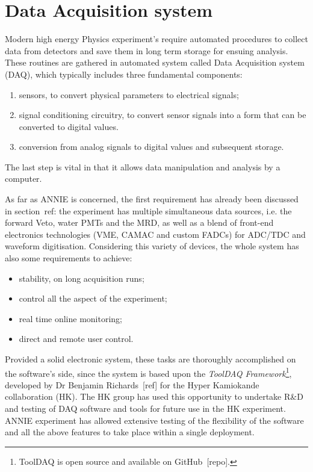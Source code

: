 
\chapter[Data Acquisition]{Data Acquisition system}
\label{cha:3}

Modern high energy Physics experiment's require automated procedures to collect data from detectors %
and save them in long term storage for ensuing analysis.
These routines are gathered in automated system called Data Acquisition system (DAQ), %
which typically includes three fundamental components:
\begin{enumerate}
  \item sensors, to convert physical parameters to electrical signals;
  \item signal conditioning circuitry, to convert sensor signals into a form that %
    can be converted to digital values.
  \item conversion from analog signals to digital values and subsequent storage.
\end{enumerate}
The last step is vital in that it allows data manipulation and analysis by a computer.

As far as ANNIE is concerned, the first requirement has already been discussed in section~ref: %
the experiment has multiple simultaneous data sources, i.e. %
the forward Veto, water PMTs and the MRD, as well as a blend of front-end %
electronics technologies (VME, CAMAC and custom FADCs) for ADC/TDC and waveform digitisation.
Considering this variety of devices, the whole system has also some requirements to achieve:
\begin{itemize}
  \item stability, on long acquisition runs;
  \item control all the aspect of the experiment;
  \item real time online monitoring;
  \item direct and remote user control.
\end{itemize}

Provided a solid electronic system, these tasks are thoroughly accomplished on the %
software's side, since the system is based upon the %
\emph{ToolDAQ Framework}\footnote{ToolDAQ %
  is open source and available on GitHub~[repo].}, developed %
by Dr Benjamin Richards~[ref] for the Hyper Kamiokande collaboration (HK).
The HK group has used this opportunity to undertake R\&D and testing of %
DAQ software and tools for future use in the HK experiment.
ANNIE experiment has allowed extensive testing of the flexibility of the software %
and all the above features to take place within a single deployment.

